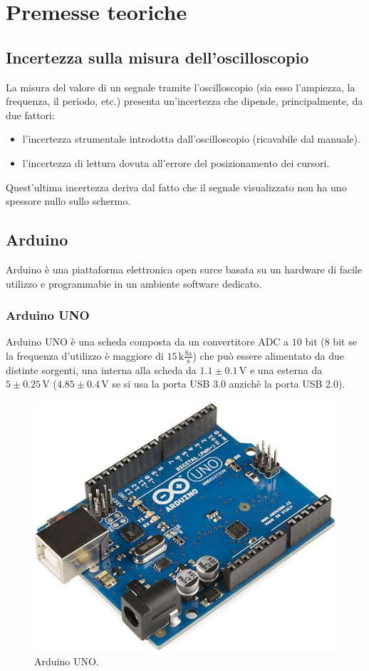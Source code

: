 \documentclass[a4paper]{article}
\begin{document}
	\section{Premesse teoriche}
		\subsection{Incertezza sulla misura dell'oscilloscopio}
			La misura del valore di un segnale tramite l’oscilloscopio (sia esso l'ampiezza, la frequenza, il periodo, etc.) presenta un'incertezza che dipende, principalmente, da due fattori:
			\begin{itemize}
				\item l’incertezza strumentale introdotta dall’oscilloscopio (ricavabile dal manuale).
				\item l’incertezza di lettura dovuta all’errore del posizionamento dei cursori.
			\end{itemize}
			Quest’ultima incertezza deriva dal fatto che il segnale visualizzato non ha uno spessore nullo sullo schermo.
		\subsection{Arduino}
			Arduino è una piattaforma elettronica open surce basata su un hardware di facile utilizzo e programmabie in un ambiente software dedicato.
			\subsubsection{Arduino UNO}
				Arduino UNO è una scheda composta da un convertitore ADC a $ 10 $ bit ($ 8 $ bit se la frequenza d'utilizzo è maggiore di $ 15 \, \mathrm{k\frac{Sa}{s}} $) che può essere alimentato da due distinte sorgenti, una interna alla scheda da $ 1.1 \pm 0.1 \, \mathrm{V} $ e una esterna da $ 5 \pm 0.25 \, \mathrm{V} $ ($ 4.85 \pm 0.4 \, \mathrm{V} $ se si usa la porta USB 3.0 anzichè la porta USB 2.0).
				\begin{figure}[h!]
					\centering
					\includegraphics[scale=0.6]{ArduinoUNO}
					\caption{Arduino UNO.}
					\label{fig:ArduinoUNO}
				\end{figure}
\end{document}
